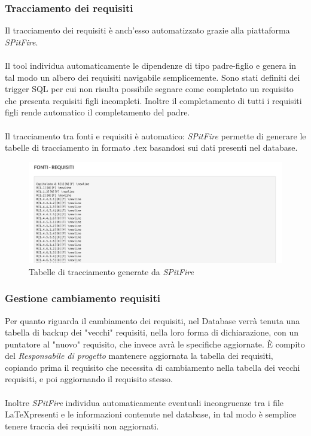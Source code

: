 \documentclass[a4paper]{article}
\begin{document}
        
        \subsubsection{Tracciamento dei requisiti}
            Il tracciamento dei requisiti è anch'esso automatizzato grazie alla piattaforma \emph{SPitFire}. 
            \\ \\
            Il tool individua automaticamente le dipendenze di tipo padre-figlio e genera in tal modo un albero dei requisiti navigabile semplicemente. Sono stati definiti dei trigger SQL per cui non risulta possibile segnare come completato un requisito che presenta requisiti figli incompleti. Inoltre il completamento di tutti i requisiti figli rende automatico il completamento del padre.
            \\ \\
            Il tracciamento tra fonti e requisiti è automatico: \emph{SPitFire} permette di generare le tabelle di tracciamento in formato .tex basandosi sui dati presenti nel database.
            \begin{figure}[H]
				\centering
				\includegraphics[width=\textwidth]{spitfire-tracciamento.png}
				\caption{Tabelle di tracciamento generate da  \emph{SPitFire}}
			\end{figure}
		\subsubsection{Gestione cambiamento requisiti}
		Per quanto riguarda il cambiamento dei requisiti, nel Database verrà tenuta una tabella di backup dei "vecchi" requisiti,
		nella loro forma di dichiarazione, con un puntatore al "nuovo" requisito, che invece avrà le specifiche aggiornate. È compito del
		\emph{Responsabile di progetto} mantenere aggiornata la tabella dei requisiti, copiando prima il requisito che necessita di cambiamento
		nella tabella dei vecchi requisiti, e poi aggiornando il requisito stesso.
		\\ \\
		Inoltre \emph{SPitFire } individua automaticamente eventuali incongruenze tra i file \LaTeX presenti e le informazioni contenute nel database, in tal modo è semplice tenere traccia dei requisiti non aggiornati.
\end{document}
